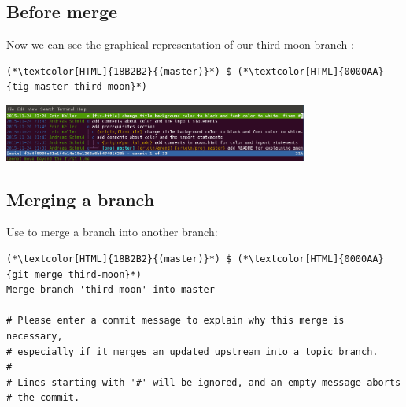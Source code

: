 \subsection{Before merge}
\begin{frame}[fragile]
  \subslidetitle

  Now we can see the graphical representation of our third-moon branch :
  \begin{lstlisting}
(*\textcolor[HTML]{18B2B2}{(master)}*) $ (*\textcolor[HTML]{0000AA}{tig master third-moon}*)
\end{lstlisting}

  \vspace{1em}

  \centerline{\includegraphics[width=10cm]{../screen/tig-fix-title-rebase-master.png}}

\end{frame}


\subsection{Merging a branch}
\begin{frame}[fragile]
  \subslidetitle

  Use  to merge a branch into another branch:

  \begin{lstlisting}
(*\textcolor[HTML]{18B2B2}{(master)}*) $ (*\textcolor[HTML]{0000AA}{git merge third-moon}*)
Merge branch 'third-moon' into master

# Please enter a commit message to explain why this merge is necessary,
# especially if it merges an updated upstream into a topic branch.
#
# Lines starting with '#' will be ignored, and an empty message aborts
# the commit.
\end{lstlisting}


\end{frame}

